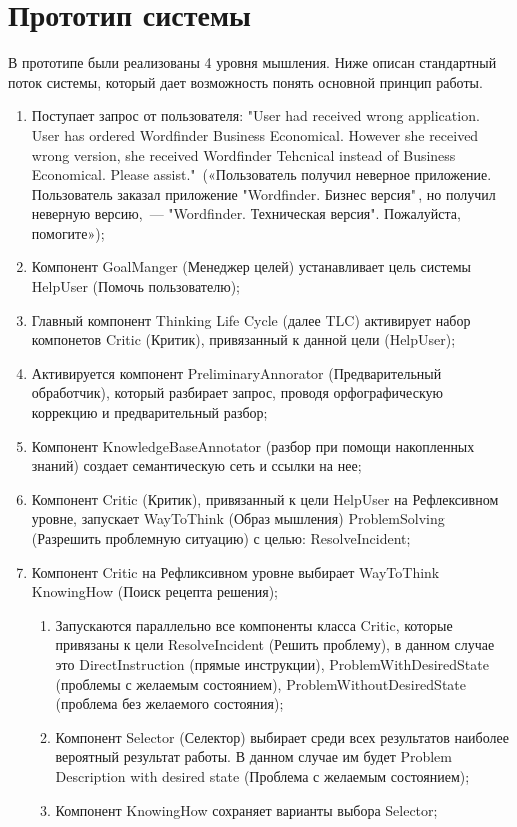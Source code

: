 \section{Прототип системы}
В прототипе были реализованы 4 уровня мышления. Ниже описан стандартный поток системы, который дает возможность понять основной принцип работы.
\begin{enumerate}
	\item Поступает запрос от пользователя: 
	"User had received wrong application. User has ordered Wordfinder Business Economical. However she received wrong version, she received Wordfinder Tehcnical instead of Business Economical. Please assist."\ («Пользователь получил неверное приложение. Пользователь заказал приложение "Wordfinder. Бизнес версия"\,, но получил неверную версию,~--- "Wordfinder. Техническая версия". Пожалуйста, помогите»);
	\item Компонент GoalManger (Менеджер целей) устанавливает цель системы HelpUser (Помочь пользователю);
	\item Главный компонент Thinking Life Cycle (далее TLC) активирует набор компонетов Critic (Критик), привязанный к данной цели (HelpUser); 
	\item Активируется компонент PreliminaryAnnorator (Предварительный обработчик), который разбирает запрос, проводя орфографическую коррекцию и предварительный разбор;
	\item Компонент KnowledgeBaseAnnotator (разбор при помощи накопленных знаний) создает семантическую сеть и ссылки на нее;
	\item Компонент Critic (Критик), привязанный к цели HelpUser на Рефлексивном уровне, запускает WayToThink (Образ мышления) ProblemSolving (Разрешить проблемную ситуацию) с целью: ResolveIncident;
	\item Компонент Critic на Рефликсивном уровне выбирает WayToThink KnowingHow (Поиск рецепта решения);
	\begin{enumerate}
	\item Запускаются параллельно все компоненты класса Critic, которые привязаны к цели ResolveIncident (Решить проблему), в данном случае это DirectInstruction (прямые инструкции), ProblemWithDesiredState (проблемы с желаемым состоянием), ProblemWithoutDesiredState (проблема без желаемого состояния);
	\item Компонент Selector (Селектор) выбирает среди всех результатов наиболее вероятный результат работы. В данном случае им будет Problem Description with desired state (Проблема с желаемым состоянием);
	\item Компонент KnowingHow сохраняет варианты выбора Selector;

\end{enumerate}
\end{enumerate}
